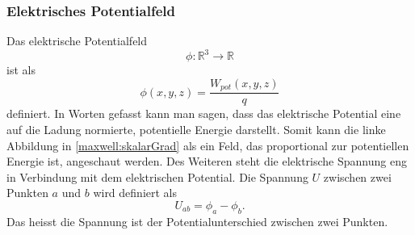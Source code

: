 \subsubsection{Elektrisches Potentialfeld}
Das elektrische Potentialfeld
\[
\phi:\mathbb{R}^3
\rightarrow
\mathbb{R}
\]
ist als
\begin{equation}
	\phi(x,y,z)
	=
	\frac{W_{pot}(x,y,z)}{q}
	\label{maxwell:section:definition_elektrischespotentialfeld}
\end{equation}
definiert.
In Worten gefasst kann man sagen, dass das elektrische Potential eine auf die Ladung normierte, potentielle Energie darstellt.
Somit kann die linke Abbildung in \ref{maxwell:skalarGrad} als ein Feld, das proportional zur potentiellen Energie ist, angeschaut werden.
Des Weiteren steht die elektrische Spannung eng in Verbindung mit dem elektrischen Potential.
Die Spannung $U$ zwischen zwei Punkten $a$ und $b$ wird definiert als
\[
U_{ab}
=
\phi_a - \phi_b.
\]
Das heisst die Spannung ist der Potentialunterschied zwischen zwei Punkten.

